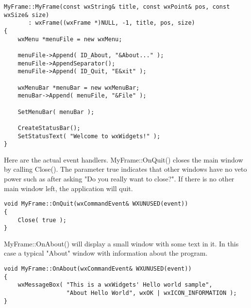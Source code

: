 \begin{verbatim}
MyFrame::MyFrame(const wxString& title, const wxPoint& pos, const wxSize& size)
       : wxFrame((wxFrame *)NULL, -1, title, pos, size)
{
    wxMenu *menuFile = new wxMenu;

    menuFile->Append( ID_About, "&About..." );
    menuFile->AppendSeparator();
    menuFile->Append( ID_Quit, "E&xit" );

    wxMenuBar *menuBar = new wxMenuBar;
    menuBar->Append( menuFile, "&File" );

    SetMenuBar( menuBar );

    CreateStatusBar();
    SetStatusText( "Welcome to wxWidgets!" );
}
\end{verbatim}

Here are the actual event handlers. MyFrame::OnQuit() closes the main window
by calling Close(). The parameter true indicates that other windows have no veto
power such as after asking "Do you really want to close?". If there is no other 
main window left, the application will quit.

\begin{verbatim}
void MyFrame::OnQuit(wxCommandEvent& WXUNUSED(event))
{
    Close( true );
}
\end{verbatim}

MyFrame::OnAbout() will display a small window with some text in it. In this
case a typical "About" window with information about the program.

\begin{verbatim}
void MyFrame::OnAbout(wxCommandEvent& WXUNUSED(event))
{
    wxMessageBox( "This is a wxWidgets' Hello world sample",
                  "About Hello World", wxOK | wxICON_INFORMATION );
}
\end{verbatim}

